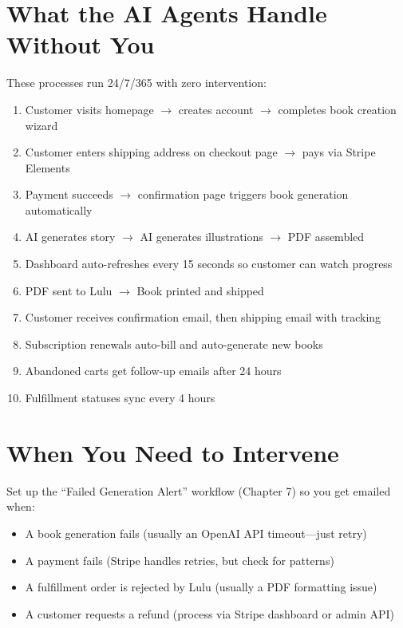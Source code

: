 \documentclass[12pt, letterpaper, oneside]{book}
\begin{document}
\section{What the AI Agents Handle Without You}

These processes run 24/7/365 with zero intervention:

\begin{enumerate}[leftmargin=2em, itemsep=2pt]
  \item Customer visits homepage $\rightarrow$ creates account $\rightarrow$ completes book creation wizard
  \item Customer enters shipping address on checkout page $\rightarrow$ pays via Stripe Elements
  \item Payment succeeds $\rightarrow$ confirmation page triggers book generation automatically
  \item AI generates story $\rightarrow$ AI generates illustrations $\rightarrow$ PDF assembled
  \item Dashboard auto-refreshes every 15 seconds so customer can watch progress
  \item PDF sent to Lulu $\rightarrow$ Book printed and shipped
  \item Customer receives confirmation email, then shipping email with tracking
  \item Subscription renewals auto-bill and auto-generate new books
  \item Abandoned carts get follow-up emails after 24 hours
  \item Fulfillment statuses sync every 4 hours
\end{enumerate}

\section{When You Need to Intervene}

Set up the ``Failed Generation Alert'' workflow (Chapter 7) so you get emailed when:
\begin{itemize}[leftmargin=2em]
  \item A book generation fails (usually an OpenAI API timeout---just retry)
  \item A payment fails (Stripe handles retries, but check for patterns)
  \item A fulfillment order is rejected by Lulu (usually a PDF formatting issue)
  \item A customer requests a refund (process via Stripe dashboard or admin API)
\end{itemize}
\end{document}
